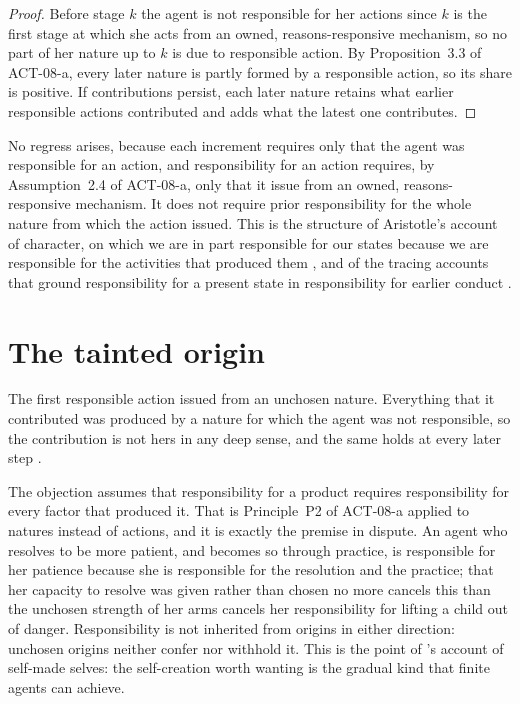 \documentclass{situationist-preprint}
\begin{document}
\begin{proof}
Before stage $k$ the agent is not responsible for her actions since $k$ is the first stage at which she acts from an owned, reasons-responsive mechanism, so no part of her nature up to $k$ is due to responsible action. By Proposition~3.3 of ACT-08-a, every later nature is partly formed by a responsible action, so its share is positive. If contributions persist, each later nature retains what earlier responsible actions contributed and adds what the latest one contributes.
\end{proof}

No regress arises, because each increment requires only that the agent was responsible for an action, and responsibility for an action requires, by Assumption~2.4 of ACT-08-a, only that it issue from an owned, reasons-responsive mechanism. It does not require prior responsibility for the whole nature from which the action issued. This is the structure of Aristotle's account of character, on which we are in part responsible for our states because we are responsible for the activities that produced them \citep[III.5]{AristotleNE}, and of the tracing accounts that ground responsibility for a present state in responsibility for earlier conduct \citep{FischerRavizza1998}.

\section{The tainted origin}

\begin{objection}
The first responsible action issued from an unchosen nature. Everything that it contributed was produced by a nature for which the agent was not responsible, so the contribution is not hers in any deep sense, and the same holds at every later step \citep{Strawson1994}.
\end{objection}

\begin{reply}
The objection assumes that responsibility for a product requires responsibility for every factor that produced it. That is Principle~P2 of ACT-08-a applied to natures instead of actions, and it is exactly the premise in dispute. An agent who resolves to be more patient, and becomes so through practice, is responsible for her patience because she is responsible for the resolution and the practice; that her capacity to resolve was given rather than chosen no more cancels this than the unchosen strength of her arms cancels her responsibility for lifting a child out of danger. Responsibility is not inherited from origins in either direction: unchosen origins neither confer nor withhold it. This is the point of \citet{Dennett1984}'s account of self-made selves: the self-creation worth wanting is the gradual kind that finite agents can achieve.
\end{reply}
\end{document}
